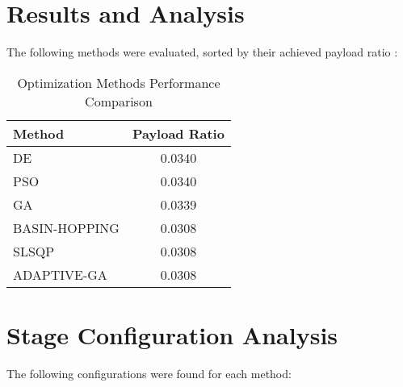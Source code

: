 \documentclass[11pt]{article}
\begin{document}
\section{Results and Analysis}
The following methods were evaluated, sorted by their achieved payload ratio \cite{pso_ascent_2013}:

\begin{table}[H]
\centering
\caption{Optimization Methods Performance Comparison}
\begin{tabular}{lc}
\toprule
Method & Payload Ratio \\
\midrule
DE & 0.0340 \\
PSO & 0.0340 \\
GA & 0.0339 \\
BASIN-HOPPING & 0.0308 \\
SLSQP & 0.0308 \\
ADAPTIVE-GA & 0.0308 \\
\bottomrule
\end{tabular}
\end{table}

\section{Stage Configuration Analysis}
The following configurations were found for each method:
\end{document}
